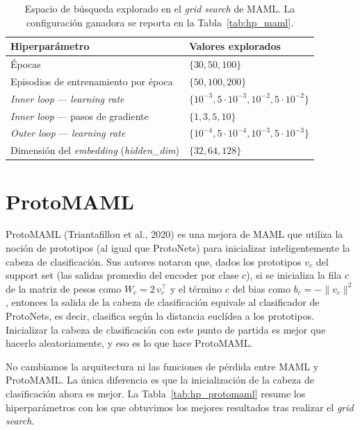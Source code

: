 \documentclass[12pt]{article}
\begin{document}
\begin{table}[H]
    \centering
    \begin{tabular}{ll}
        \hline
        Hiperparámetro                                   & Valores explorados \\
        \hline
        Épocas                                           & $\{30, 50, 100\}$ \\
        Episodios de entrenamiento por época             & $\{50, 100, 200\}$ \\
        \textit{Inner loop} — \textit{learning rate}     & $\{10^{-3}, 5 \cdot 10^{-3}, 10^{-2}, 5 \cdot 10^{-2}\}$ \\
        \textit{Inner loop} — pasos de gradiente         & $\{1, 3, 5, 10\}$ \\
        \textit{Outer loop} — \textit{learning rate}     & $\{10^{-4}, 5 \cdot 10^{-4}, 10^{-3}, 5 \cdot 10^{-3}\}$ \\
        Dimensión del \textit{embedding} (\textit{hidden\_dim}) & $\{32, 64, 128\}$ \\
        \hline
    \end{tabular}
    \caption{Espacio de búsqueda explorado en el \textit{grid search} de MAML. La configuración ganadora se reporta en la Tabla~\ref{tab:hp_maml}.}
    \label{tab:gs_maml}
\end{table}

\section{ProtoMAML}

ProtoMAML (Triantafillou et al., 2020) es una mejora de MAML que utiliza la noción de prototipos (al igual que ProtoNets) para inicializar inteligentemente la cabeza de clasificación. Sus autores notaron que, dados los prototipos $v_c$ del support set (las salidas promedio del encoder por clase $c$), si se inicializa la fila $c$ de la matriz de pesos como $W_c = 2\,v_c^\top$ y el término $c$ del bias como $b_c = -\|v_c\|^2$, entonces la salida de la cabeza de clasificación equivale al clasificador de ProtoNets, es decir, clasifica según la distancia euclídea a los prototipos. Inicializar la cabeza de clasificación con este punto de partida es mejor que hacerlo aleatoriamente, y eso es lo que hace ProtoMAML.

No cambiamos la arquitectura ni las funciones de pérdida entre MAML y ProtoMAML. La única diferencia es que la inicialización de la cabeza de clasificación ahora es mejor. La Tabla~\ref{tab:hp_protomaml} resume los hiperparámetros con los que obtuvimos los mejores resultados tras realizar el \textit{grid search}.
\end{document}
